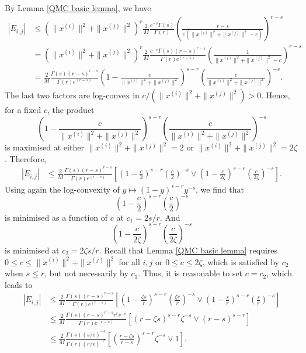 By Lemma \ref{QMC basic lemma}, we have
\begin{align*}
|E_{i,j} |
&\leq ( \| x^{(i)} \| ^2+ \| x^{(j)} \| ^2)^r \frac{2}{M} \frac{c^{-s}\Gamma(s)}{\Gamma(r)} \left(\frac{r-s}{e( \| x^{(i)} \| ^2+ \| x^{(j)} \| ^2-c)}\right)^{r-s} \\
&= ( \| x^{(i)} \| ^2+ \| x^{(j)} \| ^2)^r \frac{2}{M} \frac{c^{-s}\Gamma(s)(r-s)^{r-s}}{\Gamma(r)e^{(r-s)}} \left(\frac{1}{ \| x^{(i)} \| ^2+ \| x^{(j)} \| ^2-c}\right)^{r-s} \\
&= \frac{2}{M} \frac{\Gamma(s)(r-s)^{r-s}}{\Gamma(r)e^{(r-s)}} \left(1-\frac{c}{ \| x^{(i)} \| ^2+ \| x^{(j)} \| ^2}\right)^{s-r} \left(\frac{c}{ \| x^{(i)} \| ^2+ \| x^{(j)} \| ^2}\right)^{-s} .
\end{align*} 
The last two factors are log-convex in $c/( \| x^{(i)} \| ^2+ \| x^{(j)} \| ^2)>0$. Hence, for a fixed $c$, the product
$$\left(1-\frac{c}{ \| x^{(i)} \| ^2+ \| x^{(j)} \| ^2}\right)^{s-r} \left(\frac{c}{ \| x^{(i)} \| ^2+ \| x^{(j)} \| ^2}\right)^{-s} $$
 is maximised at either $ \| x^{(i)} \| ^2+ \| x^{(j)} \| ^2=2$ or $ \| x^{(i)} \| ^2+ \| x^{(j)} \| ^2=2\zeta$. Therefore,
\begin{align*}
|E_{i,j}|
&\leq \frac{2}{M} \frac{\Gamma(s)(r-s)^{r-s}}{\Gamma(r)e^{(r-s)}} \left[\left(1-\frac{c}{2}\right)^{s-r} \left(\frac{c}{2}\right)^{-s} \vee \left(1-\frac{c}{2\zeta}\right)^{s-r} \left(\frac{c}{2\zeta}\right)^{-s}\right].
\end{align*} 
Using again the log-convexity of $y\mapsto (1-y)^{s-r} y^{-s}$, we find that 
$$\left(1-\frac{c}{2}\right)^{s-r} \left(\frac{c}{2}\right)^{-s} $$
is minimised as a function of $c$ at $c_1 = 2s/r$. And
$$\left(1-\frac{c}{2\zeta}\right)^{s-r} \left(\frac{c}{2\zeta}\right)^{-s}$$
is minimised at $c_2 = 2\zeta s/r$. Recall that Lemma \ref{QMC basic lemma} requires $0\le c\leq  \| x^{(i)} \| ^2+ \| x^{(j)} \| ^2$ for all $i,j$ or $0\le c\leq 2\zeta$, which is satisfied by $c_2$ when $s\le r$, but not necessarily by $c_1$. Thus, it is reasonable to set $c=c_2$, which leads to
\begin{align*}
|E_{i,j}| 
&\leq \frac{2}{M} \frac{\Gamma(s)(r-s)^{r-s}}{\Gamma(r)e^{(r-s)}} \left[\left(1-\frac{\zeta s}{r}\right)^{s-r} \left(\frac{\zeta s}{r}\right)^{-s} \vee \left(1- \frac{s}{r}\right)^{s-r} \left( \frac{s}{r}\right)^{-s}\right] \\
&\leq \frac{2}{M} \frac{\Gamma(s)(r-s)^{r-s}r^{r}s^{-s}}{\Gamma(r)e^{(r-s)}} \left[\left(r-\zeta s\right)^{s-r} \zeta^{-s} \vee \left(r- s\right)^{s-r} \right] \\
&\leq \frac{2}{M} \frac{\Gamma(s)(s/e)^{-s}}{\Gamma(r)(r/e)^{-r}} \left[\left(\frac{r-\zeta s}{r-s}\right)^{s-r} \zeta^{-s} \vee 1 \right] .
\end{align*} 
